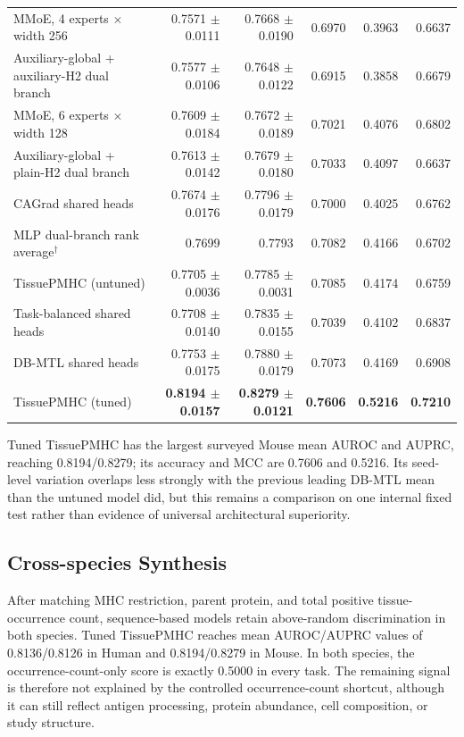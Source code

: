 \begin{table}[t]
\begin{tabularx}{\textwidth}{>{\raggedright\arraybackslash}Xrrrrr}
MMoE, 4 experts $\times$ width 256 & 0.7571 $\pm$ 0.0111 & 0.7668 $\pm$ 0.0190 & 0.6970 & 0.3963 & 0.6637 \\
Auxiliary-global + auxiliary-H2 dual branch & 0.7577 $\pm$ 0.0106 & 0.7648 $\pm$ 0.0122 & 0.6915 & 0.3858 & 0.6679 \\
MMoE, 6 experts $\times$ width 128 & 0.7609 $\pm$ 0.0184 & 0.7672 $\pm$ 0.0189 & 0.7021 & 0.4076 & 0.6802 \\
Auxiliary-global + plain-H2 dual branch & 0.7613 $\pm$ 0.0142 & 0.7679 $\pm$ 0.0180 & 0.7033 & 0.4097 & 0.6637 \\
CAGrad shared heads & 0.7674 $\pm$ 0.0176 & 0.7796 $\pm$ 0.0179 & 0.7000 & 0.4025 & 0.6762 \\
MLP dual-branch rank average$^\dagger$ & 0.7699 & 0.7793 & 0.7082 & 0.4166 & 0.6702 \\
TissuePMHC (untuned) & 0.7705 $\pm$ 0.0036 & 0.7785 $\pm$ 0.0031 & 0.7085 & 0.4174 & 0.6759 \\
Task-balanced shared heads & 0.7708 $\pm$ 0.0140 & 0.7835 $\pm$ 0.0155 & 0.7039 & 0.4102 & 0.6837 \\
DB-MTL shared heads & 0.7753 $\pm$ 0.0175 & 0.7880 $\pm$ 0.0179 & 0.7073 & 0.4169 & 0.6908 \\
TissuePMHC (tuned) & \textbf{0.8194 $\pm$ 0.0157} & \textbf{0.8279 $\pm$ 0.0121} & \textbf{0.7606} & \textbf{0.5216} & \textbf{0.7210} \\
\bottomrule
\end{tabularx}
\end{table}
\FloatBarrier

Tuned TissuePMHC has the largest surveyed Mouse mean AUROC and AUPRC, reaching 0.8194/0.8279; its accuracy and MCC are 0.7606 and 0.5216. Its seed-level variation overlaps less strongly with the previous leading DB-MTL mean than the untuned model did, but this remains a comparison on one internal fixed test rather than evidence of universal architectural superiority.

\subsection{Cross-species Synthesis}

After matching MHC restriction, parent protein, and total positive tissue-occurrence count, sequence-based models retain above-random discrimination in both species. Tuned TissuePMHC reaches mean AUROC/AUPRC values of 0.8136/0.8126 in Human and 0.8194/0.8279 in Mouse. In both species, the occurrence-count-only score is exactly 0.5000 in every task. The remaining signal is therefore not explained by the controlled occurrence-count shortcut, although it can still reflect antigen processing, protein abundance, cell composition, or study structure.
